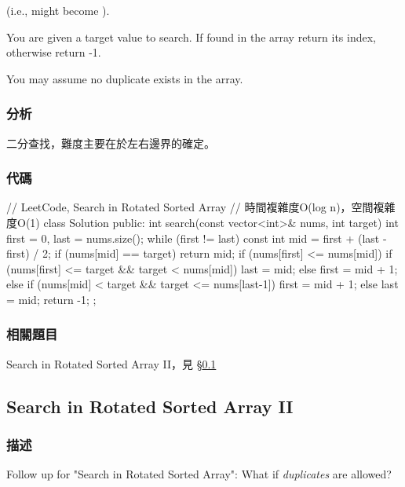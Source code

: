 (i.e.,  might become ).

You are given a target value to search. If found in the array return its index, otherwise return -1.

You may assume no duplicate exists in the array.


\subsubsection{分析}
二分查找，難度主要在於左右邊界的確定。


\subsubsection{代碼}
\begin{Code}
// LeetCode, Search in Rotated Sorted Array
// 時間複雜度O(log n)，空間複雜度O(1)
class Solution {
public:
    int search(const vector<int>& nums, int target) {
        int first = 0, last = nums.size();
        while (first != last) {
            const int mid = first  + (last - first) / 2;
            if (nums[mid] == target)
                return mid;
            if (nums[first] <= nums[mid]) {
                if (nums[first] <= target && target < nums[mid])
                    last = mid;
                else
                    first = mid + 1;
            } else {
                if (nums[mid] < target && target <= nums[last-1])
                    first = mid + 1;
                else
                    last = mid;
            }
        }
        return -1;
    }
};
\end{Code}


\subsubsection{相關題目}

\begindot
\item Search in Rotated Sorted Array II，見 \S \ref{sec:search-in-rotated-sorted-array-ii}
\myenddot


\subsection{Search in Rotated Sorted Array II}
\label{sec:search-in-rotated-sorted-array-ii}


\subsubsection{描述}
Follow up for "Search in Rotated Sorted Array": What if \emph{duplicates} are allowed?

